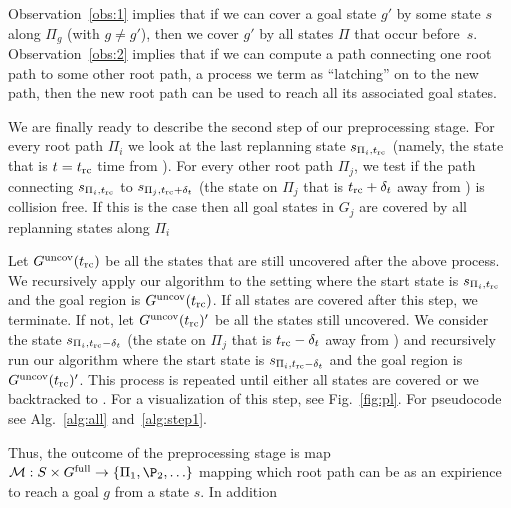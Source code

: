 \documentclass[conference]{IEEEtran}
\begin{document}
%
Observation~\ref{obs:1} implies that if we can cover a goal state $g'$  by some state $s$ along $\Pi_g$ (with $g \neq g'$), then we cover $g'$ by all states $\Pi$ that occur before~$s$.
%
Observation~\ref{obs:2} implies that if we can compute a path connecting one root path to some other root path, a process we term as ``latching'' on to the new path, then the new root path can be used to reach all its associated goal states.

We are finally ready to describe the second step of our preprocessing stage.
%
For every root path $\Pi_i$ we look at the last replanning state $s_{\Pi_i, t_{\textrm{rc}}}$ (namely, the state that is $t=t_{\textrm{rc}}$ time from \Shome). For every other root path $\Pi_j$, we test if the path connecting $s_{\Pi_i, t_{\textrm{rc}}}$ to $s_{\Pi_j, t_{\textrm{rc}} + \delta_t}$ (the state on $\Pi_j$ that is $t_{\textrm{rc}}+\delta_t$ away from \Shome) is collision free. 
%
If this is the case then all goal states in $G_j$ are covered by all replanning states along $\Pi_i$
%

Let $G^{\textrm{uncov}}(t_{\textrm{rc}})$ be all the states that are still uncovered after the above process. We recursively apply our algorithm to the setting where the start state is $s_{\Pi_i, t_{\textrm{rc}}}$ and the goal region is $G^{\textrm{uncov}}(t_{\textrm{rc}})$.
If all states are covered after this step, we terminate. 
If not, let $G^{\textrm{uncov}}(t_{\textrm{rc}})'$ be all the states still uncovered.
We consider the state $s_{\Pi_i, t_{\textrm{rc}}-\delta_t}$ (the state on $\Pi_j$ that is $t_{\textrm{rc}}-\delta_t$ away from \Shome) and recursively run our algorithm where the start state is $s_{\Pi_i, t_{\textrm{rc}}-\delta_t}$ and the goal region is $G^{\textrm{uncov}}(t_{\textrm{rc}})'$.
This process is repeated until either all states are covered or we backtracked to \Shome.
For a visualization of this step, see Fig.~\ref{fig:pl}.
For pseudocode see Alg.~\ref{alg:all} and~\ref{alg:step1}.

Thus, the outcome of the preprocessing stage is map $\calM: S \times \Gfull \rightarrow \{ \Pi_1, \P_2, \ldots \}$ mapping which root path can be as an expirience to reach a goal $g$ from a state $s$.
%
In addition 
\end{document}
